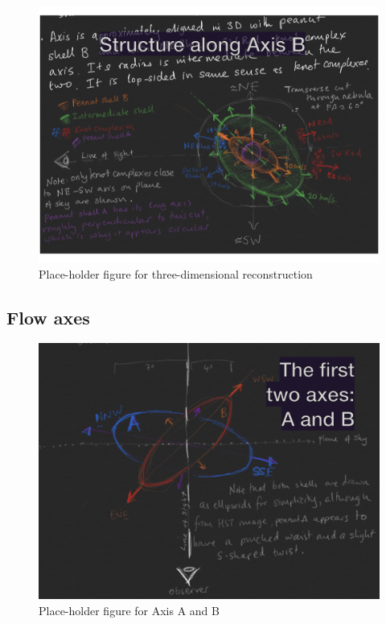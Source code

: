 \documentclass[useAMS, usenatbib]{mnras}
\begin{document}
\begin{figure}
  \includegraphics[width=\linewidth]
  {talk-figs/turtle-talk-morelia-2020-02-export-011}
  \caption{Place-holder figure for three-dimensional reconstruction}
  \label{fig:axis-B-3d}
\end{figure}

\subsection{Flow axes}
\label{sec:flow-axes}

\begin{figure}
  \includegraphics[width=\linewidth]
  {talk-figs/turtle-talk-morelia-2020-02-export-010}
  \caption{Place-holder figure for Axis A and B}
  \label{fig:flow-axes-AB}
\end{figure}
\end{document}
